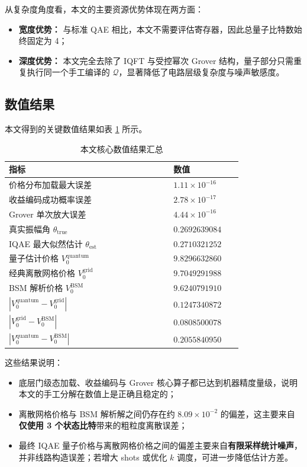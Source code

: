 \documentclass[12pt,a4paper]{ctexart}
\begin{document}
从复杂度角度看，本文的主要资源优势体现在两方面：
\begin{itemize}[leftmargin=2em]
\item \textbf{宽度优势：} 与标准 QAE 相比，本文不需要评估寄存器，因此总量子比特数始终固定为 4；
\item \textbf{深度优势：} 本文完全去除了 IQFT 与受控幂次 Grover 结构，量子部分只需重复执行同一个手工编译的 $\mathcal{Q}$，显著降低了电路层级复杂度与噪声敏感度。
\end{itemize}

\subsection{数值结果}
本文得到的关键数值结果如表 \ref{tab:numerics} 所示。

\begin{table}[H]
\centering
\caption{本文核心数值结果汇总}
\label{tab:numerics}
\begin{tabular}{>{\raggedright\arraybackslash}p{0.58\linewidth} >{\raggedleft\arraybackslash}p{0.24\linewidth}}
\toprule
指标 & 数值 \\
\midrule
价格分布加载最大误差 & $1.11\times 10^{-16}$ \\
收益编码成功概率误差 & $2.78\times 10^{-17}$ \\
Grover 单次放大误差 & $4.44\times 10^{-16}$ \\
真实振幅角 $\theta_{\mathrm{true}}$ & $0.2692639084$ \\
IQAE 最大似然估计 $\theta_{\mathrm{est}}$ & $0.2710321252$ \\
量子估计价格 $V_0^{\mathrm{quantum}}$ & $9.8296632860$ \\
经典离散网格价格 $V_0^{\mathrm{grid}}$ & $9.7049291988$ \\
BSM 解析价格 $V_0^{\mathrm{BSM}}$ & $9.6240791910$ \\
$|V_0^{\mathrm{quantum}}-V_0^{\mathrm{grid}}|$ & $0.1247340872$ \\
$|V_0^{\mathrm{grid}}-V_0^{\mathrm{BSM}}|$ & $0.0808500078$ \\
$|V_0^{\mathrm{quantum}}-V_0^{\mathrm{BSM}}|$ & $0.2055840950$ \\
\bottomrule
\end{tabular}
\end{table}

这些结果说明：
\begin{itemize}[leftmargin=2em]
\item 底层门级态加载、收益编码与 Grover 核心算子都已达到机器精度量级，说明本文的手工分解在数值上是正确且稳定的；
\item 离散网格价格与 BSM 解析解之间仍存在约 $8.09\times 10^{-2}$ 的偏差，这主要来自\textbf{仅使用 3 个状态比特}带来的粗粒度离散误差；
\item 最终 IQAE 量子价格与离散网格价格之间的偏差主要来自\textbf{有限采样统计噪声}，并非线路构造误差；若增大 shots 或优化 $k$ 调度，可进一步降低估计方差。
\end{itemize}
\end{document}
